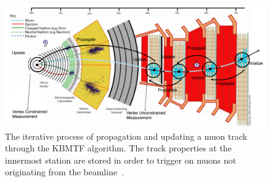 \begin{figure} [htb!]
	\centering
	\includegraphics[width=0.85\linewidth]{figs/04_muons/kbmtf_diagram.png}
	\caption[The iterative process of propagation and updating a muon track through the KBMTF algorithm. The track properties at the innermost station are stored in order to trigger on muons not originating from the beamline~\cite{CERN-LHCC-2020-004}]
	{The iterative process of propagation and updating a muon track through the KBMTF algorithm. The track properties at the innermost station are stored in order to trigger on muons not originating from the beamline~\cite{CERN-LHCC-2020-004}.}
	\label{fig:kbmtf}
\end{figure}

